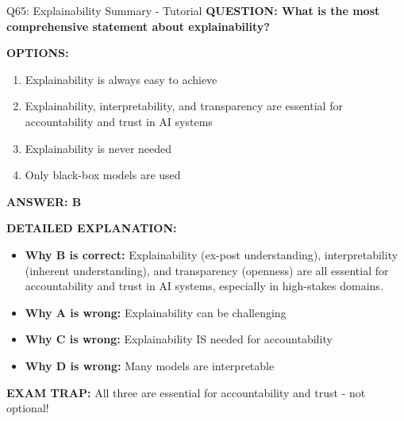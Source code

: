 \documentclass[8pt]{beamer}
\begin{document}
	\begin{frame}{Q65: Explainability Summary - Tutorial}
		\fontsize{6.5}{7.5}\selectfont
		\textbf{QUESTION: What is the most comprehensive statement about explainability?}
		
		\vspace{0.1cm}
		\textbf{OPTIONS:}
		\begin{enumerate}
			\item Explainability is always easy to achieve
			\item Explainability, interpretability, and transparency are essential for accountability and trust in AI systems
			\item Explainability is never needed
			\item Only black-box models are used
		\end{enumerate}
		
		\vspace{0.1cm}
		\textcolor{myblue}{\textbf{ANSWER: B}}
		
		\vspace{0.1cm}
		\textbf{DETAILED EXPLANATION:}
		\begin{itemize}
			\item \textbf{Why B is correct:} Explainability (ex-post understanding), interpretability (inherent understanding), and transparency (openness) are all essential for accountability and trust in AI systems, especially in high-stakes domains.
			\item \textbf{Why A is wrong:} Explainability can be challenging
			\item \textbf{Why C is wrong:} Explainability IS needed for accountability
			\item \textbf{Why D is wrong:} Many models are interpretable
		\end{itemize}
		
		\textcolor{myred}{\textbf{EXAM TRAP:}} All three are \textcolor{myblue}{essential for accountability and trust} - not optional!
	\end{frame}
	
	
\end{document}
